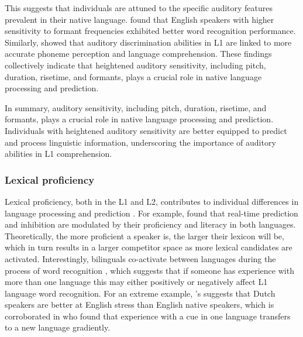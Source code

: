 This suggests that individuals are attuned to the specific auditory features prevalent in their native language. \cite{Bradlow_1994} found that English speakers with higher sensitivity to formant frequencies exhibited better word recognition performance. Similarly, \cite{Hazan_2000} showed that auditory discrimination abilities in L1 are linked to more accurate phoneme perception and language comprehension. These findings collectively indicate that heightened auditory sensitivity, including pitch, duration, risetime, and formants, plays a crucial role in native language processing and prediction.

In summary, auditory sensitivity, including pitch, duration, risetime, and formants, plays a crucial role in native language processing and prediction. Individuals with heightened auditory sensitivity are better equipped to predict and process linguistic information, underscoring the importance of auditory abilities in L1 comprehension.

\subsubsection{Lexical proficiency}
Lexical proficiency, both in the L1 and L2, contributes to individual differences in language processing and prediction \citep{Diependaele2013,Yap2012}. For example, \citep{Kukona2016} found that real-time prediction and inhibition are modulated by their proficiency and literacy in both languages. Theoretically, the more proficient a speaker is, the larger their lexicon will be, which in turn results in a larger competitor space as more lexical candidates are activated. Interestingly, bilinguals co-activate between languages during the process of word recognition \citep{kroll1997lexical,dijkstra2002architecture,marian2003competing}, which suggests that if someone has experience with more than one language this may either positively or negatively affect L1 language word recognition. For an extreme example, \cite{cutler2007dutch}'s suggests that Dutch speakers are better at English stress than English native speakers, which is corroborated in \cite{Pajak_2014} who found that experience with a cue in one language transfers to a new language gradiently. 

